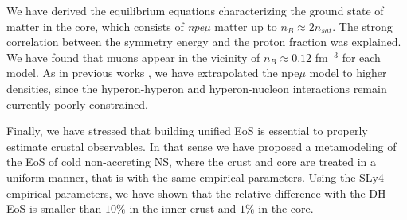 We have derived the equilibrium equations characterizing the ground state of
matter in the core, which consists of \textit{npe$\mu$} matter up to $n_B
\approx 2n_{sat}$. The strong correlation between the symmetry energy and the 
proton fraction was explained. We have found that muons appear in the vicinity 
of $n_B \approx 0.12$ fm$^{-3}$ for each model. As in previous works
\cite{Wiringa1988,Douchin2001}, we have extrapolated the npe$\mu$ model to 
higher densities, since the hyperon-hyperon and hyperon-nucleon interactions 
remain currently poorly constrained.

Finally, we have stressed that building unified EoS is essential to properly
estimate crustal observables. In that sense we have proposed a metamodeling of 
the EoS of cold non-accreting NS, where the crust and core are treated in a
uniform manner, that is with the same empirical parameters. Using the SLy4
empirical parameters, we have shown that the relative difference with the DH 
EoS is smaller than $10\%$ in the inner crust and $1\%$ in the core. 

